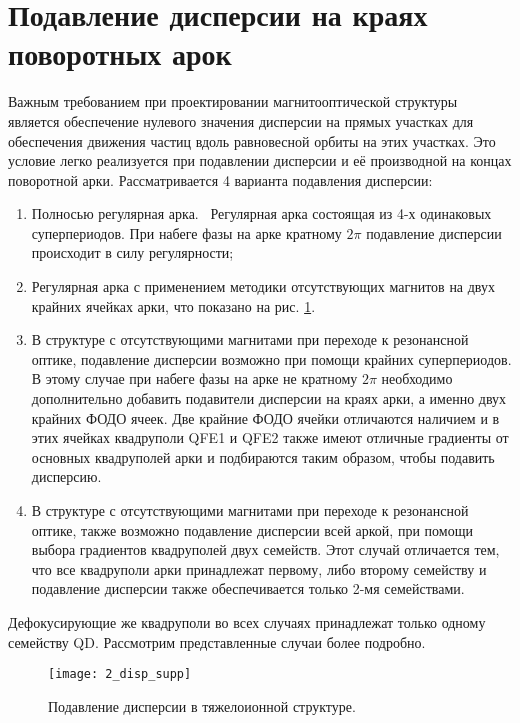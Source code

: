 \section{Подавление дисперсии на краях поворотных арок}\label{sec:transition_variation/disp_supperssion}

\par Важным требованием при проектировании магнитооптической структуры является обеспечение нулевого значения дисперсии на прямых участках для обеспечения движения частиц вдоль равновесной орбиты на этих участках. Это условие легко реализуется при подавлении дисперсии и её производной на концах поворотной арки. Рассматривается 4 варианта подавления дисперсии:

\begin{enumerate} 
\item	Полносью регулярная арка. \ Регулярная арка состоящая из 4-х одинаковых суперпериодов. При набеге фазы на арке кратному $2\pi$ подавление дисперсии происходит в силу регулярности;
\item Регулярная арка с применением методики отсутствующих магнитов на двух крайних ячейках арки, что показано на рис. \ref{fig:2_disp_supp}.
\item В структуре с отсутствующими магнитами при переходе к резонансной оптике, подавление дисперсии возможно при помощи крайних суперпериодов. В этому случае при набеге фазы на арке не кратному $2\pi$ необходимо дополнительно добавить подавители дисперсии на краях арки, а именно двух крайних ФОДО ячеек. Две крайние ФОДО ячейки отличаются наличием и в этих ячейках квадруполи QFE1 и QFE2 также имеют отличные градиенты от основных квадруполей арки и подбираются таким образом, чтобы подавить дисперсию.
\item В структуре с отсутствующими магнитами при переходе к резонансной оптике, также возможно подавление дисперсии всей аркой, при помощи выбора градиентов квадруполей двух семейств. Этот случай отличается тем, что все квадруполи арки принадлежат первому, либо второму семейству и подавление дисперсии также обеспечивается только 2-мя семействами.
\end{enumerate} 

\noindent Дефокусирующие же квадруполи во всех случаях принадлежат только одному семейству QD. Рассмотрим представленные случаи  более подробно.

\begin{figure} [h!]
	\center
	\texttt{[image: 2\_disp\_supp]}
	\caption{Подавление дисперсии в тяжелоионной структуре.}
	\label{fig:2_disp_supp}
\end{figure}

